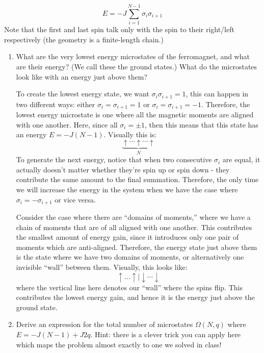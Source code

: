 \documentclass[10pt]{article}
\begin{document}
	\[
		E = -J \sum_{i = 1}^{N - 1} \sigma_i \sigma_{i + 1}
	\] 
	Note that the first and last spin talk only with the spin to their right/left respectively (the geometry is 
	a finite-length chain.)

	\begin{enumerate}[label=\alph*)]
		\item What are the very lowest energy microstates of the ferromagnet, and what are their energy? (We call
			these the ground states.) What do the microstates look like with an energy just above them?

			\begin{solution}
				To create the lowest energy state, we want $\sigma_i \sigma_{i + 1} = 1$, this can happen 
				in two different ways: either $\sigma_i = \sigma_{i + 1} = 1$ or $\sigma_i = \sigma_{i +1} = -1$.
				Therefore, the lowest energy microstate is one where all the magnetic moments are aligned 
				with one another. Here, since all $\sigma_i = \pm 1$, then this means that this state
				has an energy $E = -J(N - 1)$. Visually this is:
				\[
					\underbrace{\uparrow \cdots \uparrow \cdots \uparrow}_{N}
				\] 
				To generate the next energy, notice that when two consecutive $\sigma_i$ are equal, it actually 
				doesn't matter whether they're spin up or spin down - they contribute the same amount to 
				the final summation. Therefore, the only time we will increase the energy in the system when 
				we have the case where $\sigma_i = -\sigma_{i +1}$ or vice versa.

				Consider the case where there are ``domains of moments,'' where we have a chain of moments
				that are of all aligned with one another. This contributes the smallest amount of energy gain, 
				since it introduces only one pair of moments which are anti-aligned. Therefore, the 
				energy state just above them is the state where we have two domains of moments, or 
				alternatively one invisible ``wall'' between them. Visually, this looks like:
				\[
				\uparrow \dots \uparrow \vert \downarrow \cdots \downarrow
				\] 
				where the vertical line here denotes our ``wall'' where the spins flip. This contributes the 
				lowest energy gain, and hence it is the energy just above the ground state. 
			\end{solution}
		\item Derive an expression for the total number of microstates $\Omega(N, q)$ where $E = -J(N - 1) + 
			J 2q$. Hint: there is a clever trick you can apply here which maps the problem almost exactly to one 
			we solved in class!


\end{enumerate}
\end{document}
